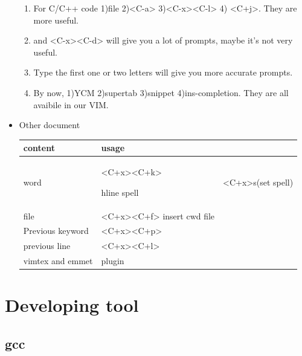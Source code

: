 \documentclass[a4paper,12pt,twoside]{book}
\begin{document}
\begin{itemize}
\begin{enumerate}
		\item For C/C++ code 1)file 2)<C-a> 3)<C-x><C-l> 4) <C+j>. They are more useful.

		\item <C-x><C-i> and <C-x><C-d> will give you a lot of prompts, maybe it's not very useful.

		\item Type the first one or two letters will give you more accurate prompts.

		\item By now, 1)YCM 2)supertab 3)snippet 4)ins-completion. They are all avaibile in our VIM. 
\end{enumerate}
\item Other document 
\begin{tabular}{p{}|p{}}
\hline 
content  & usage \\ 

\hline 
word & <C+x><C+k> 

hline
spell & <C+x>s(set spell)\\ 

\hline 
file & <C+x><C+f> insert cwd file  \\ 

\hline
Previous keyword & <C+x><C+p> \\

\hline
previous line & <C+x><C+l> \\

\hline 
vimtex and emmet & plugin \\

\hline
\end{tabular}

\end{itemize}

\chapter{Developing tool}
\section{gcc}
\end{document}
